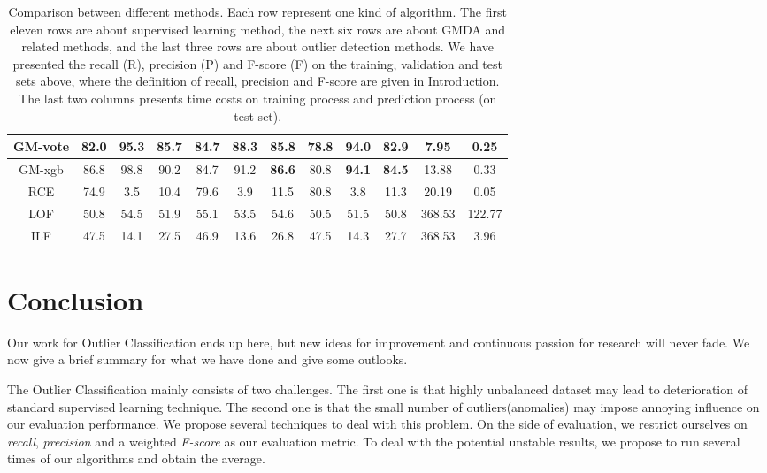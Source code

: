 \documentclass[english]{article}
\begin{document}
\begin{table}[htbp]
\begin{tabular}{|c|c|c|c|c|c|c|c|c|c|c|c|}
\hline
GM-vote & 82.0 & 95.3 & 85.7 & 84.7 & 88.3 & 85.8 & 78.8 & 94.0 & 82.9 & 7.95 & 0.25 \\
\hline
GM-xgb & 86.8 & 98.8 & 90.2 & 84.7 & 91.2 & \textbf{86.6} & 80.8 & \textbf{94.1} & \textbf{84.5} & 13.88 & 0.33 \\
\hline
RCE & 74.9 & 3.5 & 10.4 & 79.6 & 3.9 & 11.5 & 80.8 & 3.8 & 11.3 & 20.19 & 0.05 \\
\hline
LOF & 50.8 & 54.5 & 51.9 & 55.1 & 53.5 & 54.6 & 50.5 & 51.5 & 50.8 & 368.53 & 122.77 \\
\hline
ILF & 47.5 & 14.1 & 27.5 & 46.9 & 13.6 & 26.8 & 47.5 & 14.3 & 27.7 & 368.53 & 3.96 \\
\hline
	\end{tabular}
	\caption{Comparison between different methods. Each row represent one kind of algorithm. The first eleven rows are about supervised learning method, the next six rows are about GMDA and related methods, and the last three rows are about outlier detection methods. We have presented the recall (R), precision (P) and F-score (F) on the training, validation and test sets above, where the definition of recall, precision and F-score are given in Introduction. The last two columns presents time costs on training process and prediction process (on test set).}
	\label{comparison}
\end{table}

\section{Conclusion}
\par Our work for Outlier Classification ends up here, but new ideas for improvement and continuous passion for research will never fade. We now give a brief summary for what we have done and give some outlooks. 

\par The Outlier Classification mainly consists of two challenges. The first one is that highly unbalanced dataset may lead to deterioration of standard supervised learning technique. The second one is that the small number of outliers(anomalies) may impose annoying influence on our evaluation performance. We propose several techniques to deal with this problem. On the side of evaluation, we restrict ourselves on \textit{recall}, \textit{precision} and a weighted \textit{F-score} as our evaluation metric. To deal with the potential unstable results, we propose to run several times of our algorithms and obtain the average.
\end{document}

